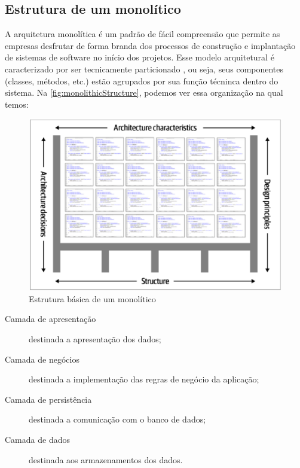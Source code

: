 \subsection{Estrutura de um monolítico}

A arquitetura monolítica é um padrão de fácil compreensão que permite as empresas desfrutar de forma
branda dos processos de construção e implantação de sistemas de software no início dos projetos.
Esse modelo arquitetural é caracterizado por ser tecnicamente particionado
\cite{Richards2020:FundamentalsOfSoftwareArchitecture}, ou seja, seus componentes
(classes, métodos, etc.) estão agrupados por sua função técninca dentro do sistema. Na
\autoref{fig:monolithicStructure}, podemos ver essa organização na qual temos:

\begin{figure}[h]
  \centering
  \includegraphics[keepaspectratio=true,scale=0.6]{figuras/richardsAndFord-architectureDefinition.eps}
  \caption{Estrutura básica de um monolítico\label{fig:monolithicStructure} }
\end{figure}

\begin{description}
    \item [Camada de apresentação] destinada a apresentação dos dados;
    \item [Camada de negócios] destinada a implementação das regras de negócio da aplicação;
    \item [Camada de persistência] destinada a comunicação com o banco de dados;
    \item [Camada de dados] destinada aos armazenamentos dos dados.
\end{description}

